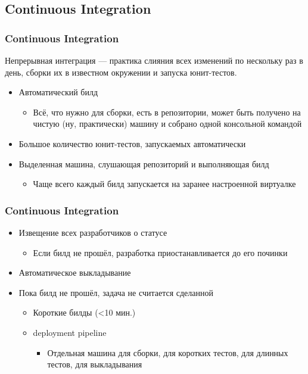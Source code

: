 \documentclass{../../slides-style}
\begin{document}
    \subsection{Continuous Integration}

    \begin{frame}
        \frametitle{Continuous Integration}
        Непрерывная интеграция --- практика слияния всех изменений по нескольку раз в день, сборки их в известном окружении и запуска юнит-тестов.
        \begin{itemize}
            \item Автоматический билд
            \begin{itemize}
                \item Всё, что нужно для сборки, есть в репозитории, может быть получено на чистую (ну, практически) машину и собрано одной консольной командой
            \end{itemize}
            \item Большое количество юнит-тестов, запускаемых автоматически
            \item Выделенная машина, слушающая репозиторий и выполняющая билд
            \begin{itemize}
                \item Чаще всего каждый билд запускается на заранее настроенной виртуалке
            \end{itemize}
        \end{itemize}
    \end{frame}

    \begin{frame}
        \frametitle{Continuous Integration}
        \begin{itemize}
            \item Извещение всех разработчиков о статусе
            \begin{itemize}
                \item Если билд не прошёл, разработка приостанавливается до его починки
            \end{itemize}
            \item Автоматическое выкладывание
            \item Пока билд не прошёл, задача не считается сделанной
            \begin{itemize}
                \item Короткие билды (<10 мин.)
                \item deployment pipeline
                \begin{itemize}
                    \item Отдельная машина для сборки, для коротких тестов, для длинных тестов, для выкладывания
                \end{itemize}
            \end{itemize}
        \end{itemize}
    \end{frame}
\end{document}
